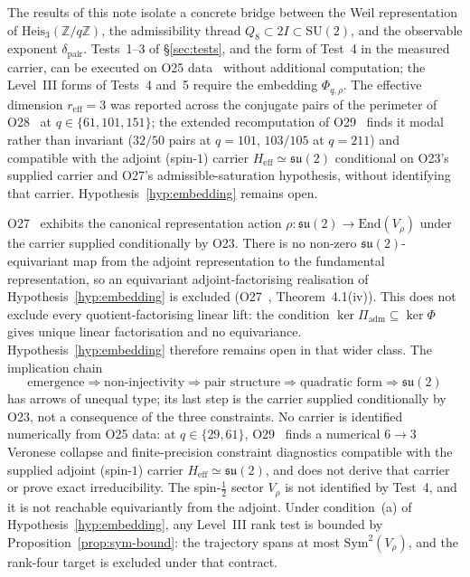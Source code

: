 \documentclass[12pt,a4paper]{article}
\theoremstyle{definition}
\theoremstyle{remark}
\begin{document}
    The results of this note isolate a concrete bridge between the Weil
    representation of $\mathrm{Heis}_3(\mathbb{Z}/q\mathbb{Z})$, the admissibility
    thread $Q_8 \subset 2I \subset \mathrm{SU}(2)$, and the observable exponent
    $\delta_{\mathrm{pair}}$.
    Tests~1--3 of §\ref{sec:tests}, and the form of Test~4 in the measured carrier, can be executed on
    O25 data~\cite{Beau2026a29} without additional computation; the Level~III forms of Tests~4 and~5
    require the embedding $\Phi_{q,\rho}$.
    The effective dimension $r_{\mathrm{eff}} = 3$ was reported across the conjugate pairs of the
    perimeter of O28~\cite{Beau2026a32} at $q \in \{61, 101, 151\}$; the extended recomputation of
    O29~\cite{Beau2026a33} finds it modal rather than invariant ($32/50$ pairs at $q = 101$,
    $103/105$ at $q = 211$) and compatible with the adjoint (spin-$1$) carrier
    $H_{\mathrm{eff}} \simeq \mathfrak{su}(2)$ conditional on O23's supplied carrier and O27's admissible-saturation
    hypothesis, without identifying
    that carrier.
    Hypothesis~\ref{hyp:embedding} remains open.

    O27~\cite{Beau2026a31} exhibits the canonical representation action
    $\rho \colon \mathfrak{su}(2) \to \mathrm{End}(V_\rho)$ under the carrier supplied
    conditionally by O23.
    There is no non-zero $\mathfrak{su}(2)$-equivariant map from the adjoint
    representation to the fundamental representation, so an equivariant adjoint-factorising
    realisation of Hypothesis~\ref{hyp:embedding} is excluded (O27~\cite{Beau2026a31},
    Theorem~4.1(iv)).
    This does not exclude every quotient-factorising linear lift: the condition
    $\ker \Pi_{\mathrm{adm}} \subseteq \ker \Phi$ gives unique linear factorisation and no
    equivariance.
    Hypothesis~\ref{hyp:embedding} therefore remains open in that wider class.
    The implication chain
    \[
      \text{emergence} \Rightarrow \text{non-injectivity} \Rightarrow
      \text{pair structure} \Rightarrow \text{quadratic form} \Rightarrow \mathfrak{su}(2)
    \]
    has arrows of unequal type; its last step is the carrier supplied conditionally by O23, not a
    consequence of the three constraints.
    No carrier is identified numerically from O25 data: at $q \in \{29, 61\}$, O29~\cite{Beau2026a33} finds a
    numerical $6 \to 3$ Veronese collapse and finite-precision constraint diagnostics compatible with the supplied
    adjoint (spin-$1$) carrier $H_{\mathrm{eff}} \simeq \mathfrak{su}(2)$, and does not derive that carrier
    or prove exact irreducibility.
    The spin-$\tfrac{1}{2}$ sector $V_\rho$ is not identified by Test~4, and it is not reachable
    equivariantly from the adjoint.
    Under condition~(a) of Hypothesis~\ref{hyp:embedding}, any Level~III rank test is bounded by
    Proposition~\ref{prop:sym-bound}: the trajectory spans at most $\mathrm{Sym}^2(V_\rho)$, and the
    rank-four target is excluded under that contract.
\end{document}
